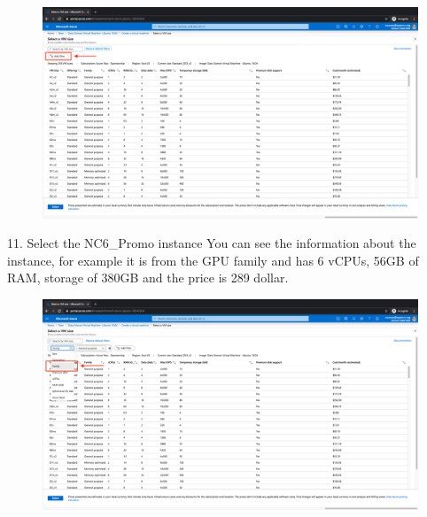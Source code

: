 \begin{figure}[H]
\begin{center} 
\includegraphics[scale=0.20]{figures/vm10}
\end{center}
\end{figure}

11. Select the NC6\_Promo instance
You can see the information about the instance, for example it is from the GPU family and has 6 vCPUs, 56GB of RAM, storage of 380GB and the price is 289 dollar.

\begin{figure}[H]
\begin{center} 
\includegraphics[scale=0.20]{figures/vm11}
\end{center}
\end{figure}

